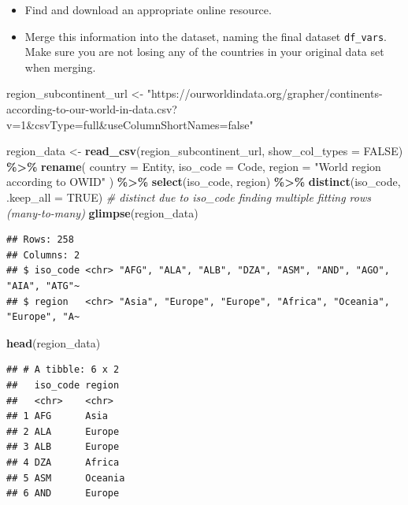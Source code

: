 \documentclass[
]{article}
\newenvironment{Shaded}{\begin{snugshade}}{\end{snugshade}}
\newcommand{\AttributeTok}[1]{\textcolor[rgb]{0.13,0.29,0.53}{#1}}
\newcommand{\CommentTok}[1]{\textcolor[rgb]{0.56,0.35,0.01}{\textit{#1}}}
\newcommand{\ConstantTok}[1]{\textcolor[rgb]{0.56,0.35,0.01}{#1}}
\newcommand{\FunctionTok}[1]{\textcolor[rgb]{0.13,0.29,0.53}{\textbf{#1}}}
\newcommand{\NormalTok}[1]{#1}
\newcommand{\OtherTok}[1]{\textcolor[rgb]{0.56,0.35,0.01}{#1}}
\newcommand{\SpecialCharTok}[1]{\textcolor[rgb]{0.81,0.36,0.00}{\textbf{#1}}}
\newcommand{\StringTok}[1]{\textcolor[rgb]{0.31,0.60,0.02}{#1}}
\providecommand{\tightlist}{%
  \setlength{\itemsep}{0pt}\setlength{\parskip}{0pt}}
\begin{document}
\begin{itemize}
\tightlist
\item
  Find and download an appropriate online resource.
\item
  Merge this information into the dataset, naming the final dataset
  \texttt{df\_vars}. Make sure you are not losing any of the countries
  in your original data set when merging.
\end{itemize}

\begin{Shaded}
\begin{Highlighting}[]
\NormalTok{region\_subcontinent\_url }\OtherTok{\textless{}{-}} \StringTok{"https://ourworldindata.org/grapher/continents{-}according{-}to{-}our{-}world{-}in{-}data.csv?v=1\&csvType=full\&useColumnShortNames=false"}

\NormalTok{region\_data }\OtherTok{\textless{}{-}} \FunctionTok{read\_csv}\NormalTok{(region\_subcontinent\_url, }\AttributeTok{show\_col\_types =} \ConstantTok{FALSE}\NormalTok{) }\SpecialCharTok{\%\textgreater{}\%}
    \FunctionTok{rename}\NormalTok{(}
    \AttributeTok{country =}\NormalTok{ Entity,}
    \AttributeTok{iso\_code =}\NormalTok{ Code,}
    \AttributeTok{region =} \StringTok{"World region according to OWID"}
\NormalTok{  ) }\SpecialCharTok{\%\textgreater{}\%}
  \FunctionTok{select}\NormalTok{(iso\_code, region) }\SpecialCharTok{\%\textgreater{}\%}
  \FunctionTok{distinct}\NormalTok{(iso\_code, }\AttributeTok{.keep\_all =} \ConstantTok{TRUE}\NormalTok{) }\CommentTok{\# distinct due to iso\_code finding multiple fitting rows (many{-}to{-}many)}
\FunctionTok{glimpse}\NormalTok{(region\_data)}
\end{Highlighting}
\end{Shaded}

\begin{verbatim}
## Rows: 258
## Columns: 2
## $ iso_code <chr> "AFG", "ALA", "ALB", "DZA", "ASM", "AND", "AGO", "AIA", "ATG"~
## $ region   <chr> "Asia", "Europe", "Europe", "Africa", "Oceania", "Europe", "A~
\end{verbatim}

\begin{Shaded}
\begin{Highlighting}[]
\FunctionTok{head}\NormalTok{(region\_data)}
\end{Highlighting}
\end{Shaded}

\begin{verbatim}
## # A tibble: 6 x 2
##   iso_code region 
##   <chr>    <chr>  
## 1 AFG      Asia   
## 2 ALA      Europe 
## 3 ALB      Europe 
## 4 DZA      Africa 
## 5 ASM      Oceania
## 6 AND      Europe
\end{verbatim}
\end{document}
